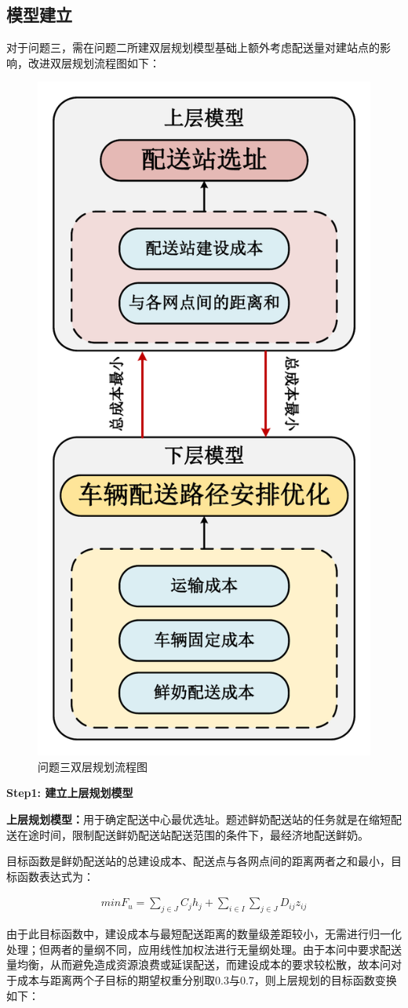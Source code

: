 \documentclass[withoutpreface,bwprint]{cumcmthesis} %
\begin{document}
\subsection{模型建立}	
对于问题三，需在问题二所建双层规划模型基础上额外考虑配送量对建站点的影响，改进双层规划流程图如下：
	\begin{figure}[htbp]
	\centering
	\includegraphics[width=0.4\linewidth]{framework2.pdf}
	\caption{问题三双层规划流程图}
	\label{fig:双层规划流程图２}
\end{figure}	

\textbf{Step1: 建立上层规划模型}

\textbf{上层规划模型：}用于确定配送中心最优选址。题述鲜奶配送站的任务就是在缩短配送在途时间，限制配送鲜奶配送站配送范围的条件下，最经济地配送鲜奶。

目标函数是鲜奶配送站的总建设成本、配送点与各网点间的距离两者之和最小，目标函数表达式为：
	
\begin{align*}
	min{{F}_{u}}=\sum_{j\in J}^{}{{{C}_{j}}}{{h}_{j}}+\sum_{i\in I}^{}{\sum_{j\in J}^{}{{{D}_{ij}}}}{{z}_{ij}}
\end{align*}	


	
	由于此目标函数中，建设成本与最短配送距离的数量级差距较小，无需进行归一化处理；但两者的量纲不同，应用线性加权法进行无量纲处理。由于本问中要求配送量均衡，从而避免造成资源浪费或延误配送，而建设成本的要求较松散，故本问对于成本与距离两个子目标的期望权重分别取0.3与0.7，则上层规划的目标函数变换如下：
	
\end{document}
